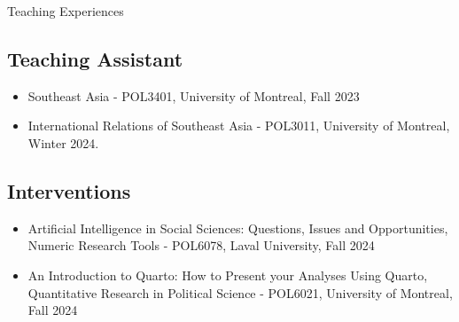 \documentclass{resume} %
\begin{document}
\begin{rSection}{Teaching Experiences}
    \subsection*{Teaching Assistant}
        \begin{itemize}
            \item Southeast Asia - POL3401, University of Montreal, Fall 2023
            \item International Relations of Southeast Asia - POL3011, University of Montreal, Winter 2024.
        \end{itemize}
    \subsection*{Interventions}
        \begin{itemize}
            \item Artificial Intelligence in Social Sciences: Questions, Issues and Opportunities, Numeric Research Tools - POL6078, Laval University, Fall 2024
            \item An Introduction to Quarto: How to Present your Analyses Using Quarto, Quantitative Research in Political Science - POL6021, University of Montreal, Fall 2024
        \end{itemize}
        
\end{rSection}

\end{document}
